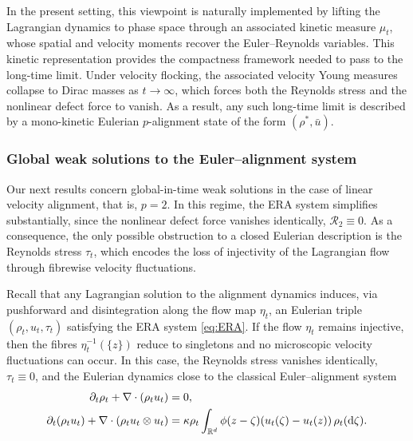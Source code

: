 \documentclass[10pt,reqno]{amsart}
\numberwithin{equation}{section}
\newcommand{\R}{\mathbb R}
\newcommand{\pa}{\partial}
\newcommand{\intr}{\int_{\R^d}}
\newcommand{\calR}{\mathcal R}
\newcommand{\rd}{\textnormal{d}}
\begin{document}
In the present setting, this viewpoint is naturally implemented by lifting the Lagrangian dynamics to phase space through an associated kinetic measure $\mu_t$, whose spatial and velocity moments recover the Euler--Reynolds variables. This kinetic representation provides the compactness framework needed to pass to the long-time limit. Under velocity flocking, the associated velocity Young measures collapse to Dirac masses as $t\to\infty$, which forces both the Reynolds stress and the nonlinear defect force to vanish. As a result, any such long-time limit is described by a mono-kinetic Eulerian $p$-alignment state of the form $(\rho^\ast, \bar u)$.







                      



 
\subsubsection{Global weak solutions to the Euler--alignment system} 
Our next results concern global-in-time weak solutions in the case of linear velocity alignment, that is, $p=2$. In this regime, the ERA system simplifies substantially, since the nonlinear defect force vanishes identically, $\calR_2 \equiv 0$. As a consequence, the only possible obstruction to a closed Eulerian description is the Reynolds stress $\tau_t$, which encodes the loss of injectivity of the Lagrangian flow through fibrewise velocity fluctuations. 
 
Recall that any Lagrangian solution to the alignment dynamics induces, via pushforward and disintegration along the flow map $\eta_t$, an Eulerian triple $(\rho_t,u_t,\tau_t)$ satisfying the
ERA system \eqref{eq:ERA}. If the flow $\eta_t$ remains injective, then the fibres $\eta_t^{-1}(\{z\})$ reduce to singletons and no microscopic velocity fluctuations can occur.
In this case, the Reynolds stress vanishes identically, $\tau_t\equiv0$, and the Eulerian dynamics close to the classical Euler--alignment system
\begin{align}\label{eq:EA-2}
\begin{aligned}
\pa_t\rho_t+\nabla \cdot(\rho_t u_t)&=0, \\
\pa_t(\rho_t u_t)+\nabla \cdot(\rho_t u_t\otimes u_t) &=\kappa \rho_t\intr \phi(z-\zeta)(u_t(\zeta)-u_t(z))\,\rho_t(\rd\zeta).
\end{aligned}
\end{align}
 
\end{document}
